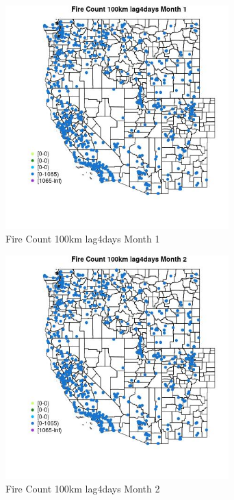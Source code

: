 \begin{figure} 
\centering  
\includegraphics[width=0.77\textwidth]{Code_Outputs/Report_ML_input_PM25_Step4_part_f_de_duplicated_aves_prioritize_24hr_obswNAs_MapObsMo1Fire_Count_100km_lag4days.jpg} 
\caption{\label{fig:Report_ML_input_PM25_Step4_part_f_de_duplicated_aves_prioritize_24hr_obswNAsMapObsMo1Fire_Count_100km_lag4days}Fire Count 100km lag4days Month 1} 
\end{figure} 
 

\clearpage 

\begin{figure} 
\centering  
\includegraphics[width=0.77\textwidth]{Code_Outputs/Report_ML_input_PM25_Step4_part_f_de_duplicated_aves_prioritize_24hr_obswNAs_MapObsMo2Fire_Count_100km_lag4days.jpg} 
\caption{\label{fig:Report_ML_input_PM25_Step4_part_f_de_duplicated_aves_prioritize_24hr_obswNAsMapObsMo2Fire_Count_100km_lag4days}Fire Count 100km lag4days Month 2} 
\end{figure} 
 

